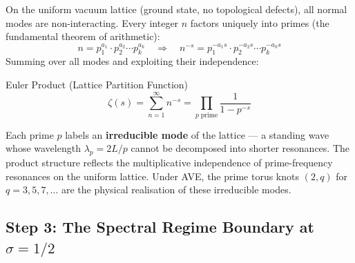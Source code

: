 On the uniform vacuum lattice (ground state, no topological defects), all normal modes are non-interacting. Every integer $n$ factors uniquely into primes (the fundamental theorem of arithmetic):
\begin{equation}
    n = p_1^{a_1} \cdot p_2^{a_2} \cdots p_k^{a_k} \quad\Longrightarrow\quad n^{-s} = p_1^{-a_1 s} \cdot p_2^{-a_2 s} \cdots p_k^{-a_k s}
\end{equation}
Summing over all modes and exploiting their independence:
\begin{resultbox}{Euler Product (Lattice Partition Function)}
\begin{equation}
    \zeta(s) = \sum_{n=1}^{\infty} n^{-s} = \prod_{p\;\mathrm{prime}} \frac{1}{1 - p^{-s}}
\end{equation}
\end{resultbox}
Each prime $p$ labels an \textbf{irreducible mode} of the lattice --- a standing wave whose wavelength $\lambda_p = 2L/p$ cannot be decomposed into shorter resonances. The product structure reflects the multiplicative independence of prime-frequency resonances on the uniform lattice. Under AVE, the prime torus knots $(2,q)$ for $q = 3, 5, 7, \ldots$ are the physical realisation of these irreducible modes.

\subsection{Step 3: The Spectral Regime Boundary at $\sigma = 1/2$}

